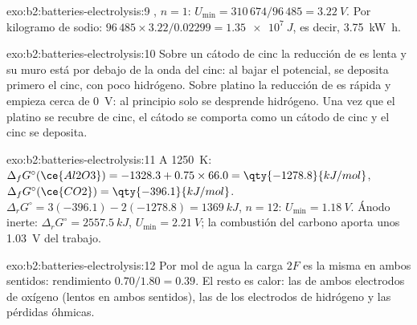 \begin{solution}{exo:b2:batteries-electrolysis:9}
, $n = 1$: $U_{\min} = 310\,674/96\,485 = \qty{3.22}{V}$.
Por kilogramo de sodio: $96\,485 \times 3.22/0.02299 = \qty{1.35e7}{J}$, es decir,
\qty{3.75}{kW.h}.
\end{solution}

\begin{solution}{exo:b2:batteries-electrolysis:10}
Sobre un cátodo de cinc la reducción de  es lenta y su muro está por debajo de la
onda del cinc: al bajar el potencial, se deposita primero el cinc, con poco
hidrógeno. Sobre platino la reducción de  es rápida y empieza cerca de
\qty{0}{V}: al principio solo se desprende hidrógeno. Una vez que el platino se recubre de
cinc, el cátodo se comporta como un cátodo de cinc y el cinc se deposita.
\end{solution}

\begin{solution}{exo:b2:batteries-electrolysis:11}
A \qty{1250}{K}: $\Delta_f G^\circ(\ce{Al2O3}) = -1328.3 + 0.75 \times 66.0 =
\qty{-1278.8}{kJ/mol}$, $\Delta_f G^\circ(\ce{CO2}) = \qty{-396.1}{kJ/mol}$. $\Delta_r G^\circ =
3(-396.1) - 2(-1278.8) = \qty{1369}{kJ}$, $n = 12$: $U_{\min} = \qty{1.18}{V}$. Ánodo inerte:
$\Delta_r G^\circ = \qty{2557.5}{kJ}$, $U_{\min} = \qty{2.21}{V}$; la combustión del carbono
aporta unos \qty{1.03}{V} del trabajo.
\end{solution}

\begin{solution}{exo:b2:batteries-electrolysis:12}
Por mol de agua la carga $2F$ es la misma en ambos sentidos: rendimiento $0.70/1.80 =
0.39$. El resto es calor: las  de ambos electrodos de oxígeno (lentos en
ambos sentidos), las de los electrodos de hidrógeno y las pérdidas óhmicas.
\end{solution}

